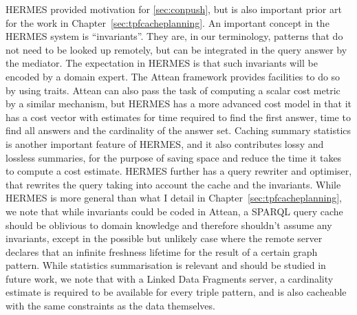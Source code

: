HERMES \cite{adali1996query} provided motivation for
\ref{sec:conpush}, but is also important prior art for the work in
Chapter~\ref{sec:tpfcacheplanning}. An important concept in the HERMES
system is ``invariants''. They are, in our terminology, patterns that
do not need to be looked up remotely, but can be integrated in the
query answer by the mediator. The expectation in HERMES is that such
invariants will be encoded by a domain expert. The Attean framework
provides facilities to do so by using traits. Attean can also pass the
task of computing a scalar cost metric by a similar mechanism, but
HERMES has a more advanced cost model in that it has a cost vector
with estimates for time required to find the first answer, time to
find all answers and the cardinality of the answer set. Caching
summary statistics is another important feature of HERMES, and it also
contributes lossy and lossless summaries, for the purpose of saving
space and reduce the time it takes to compute a cost estimate. HERMES
further has a query rewriter and optimiser, that rewrites the query
taking into account the cache and the invariants. While HERMES is more
general than what I detail in Chapter~\ref{sec:tpfcacheplanning}, we
note that while invariants could be coded in Attean, a SPARQL query
cache should be oblivious to domain knowledge and therefore shouldn't
assume any invariants, except in the possible but unlikely case where
the remote server declares that an infinite freshness lifetime for the
result of a certain graph pattern. While statistics summarisation is
relevant and should be studied in future work, we note that with a
Linked Data Fragments server, a cardinality estimate is required to be
available for every triple pattern, and is also cacheable with the
same constraints as the data themselves.

